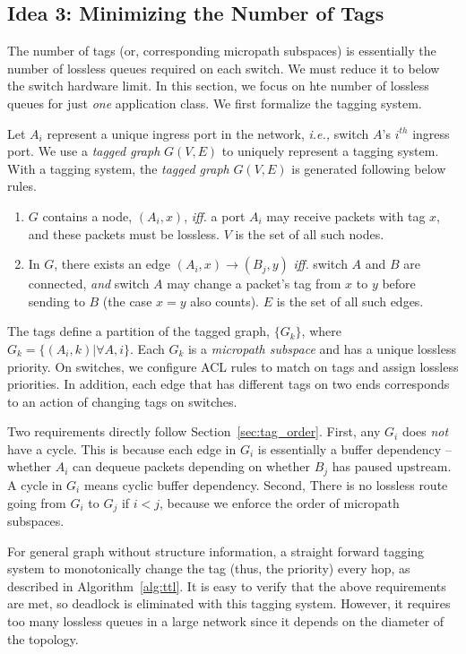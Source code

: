 \subsection{Idea 3: Minimizing the Number of Tags} 
The number of tags (or, corresponding micropath subspaces) is essentially the number of lossless queues required on each switch.
We must reduce it to below the switch hardware limit. In this section, we focus on hte number of lossless queues for 
just {\em one} application class. We first formalize the tagging system.

 Let $A_i$ represent a unique ingress port in the network, {\em i.e.,} switch $A$'s $i^{th}$ ingress port.
We use a {\em tagged graph} $G(V,E)$ to uniquely represent a tagging system.
With a tagging system, the {\em tagged graph} $G(V,E)$ is generated following below rules.

\begin{enumerate}
\item $G$ contains a node, $(A_i, x)$, {\em iff.} a port $A_i$ may receive packets with tag $x$, and these packets must 
be lossless. $V$ is the set of all such nodes.
\item In $G$, there exists an edge $(A_i, x)\rightarrow(B_j, y)$ {\em iff.} switch $A$ and $B$ are 
connected, {\em and} switch $A$ may change a packet's tag from $x$ to $y$ before sending to $B$ (the case $x=y$ also counts).
$E$ is the set of all such edges.
\end{enumerate}


The tags define a partition of the tagged graph, $\{G_k\}$, 
where $G_k = \{(A_i, k) | \forall A, i\}$. Each $G_k$ is a {\em micropath subspace} and has a unique lossless priority.
On switches, we configure ACL rules to match on tags and assign lossless priorities.
In addition, each edge that has different tags on two ends corresponds to an action of changing tags on switches.

Two requirements directly follow Section~\ref{sec:tag_order}. First, any $G_i$ does {\em not} have a cycle. This is because
each edge in $G_i$ is essentially a buffer dependency -- whether $A_i$ can dequeue packets depending on whether $B_j$ 
has paused upstream. A cycle in $G_i$ means cyclic buffer dependency. Second, There is no lossless route going from 
$G_i$ to $G_j$ if $i<j$, because we enforce the order of micropath subspaces.


 For general graph without structure information, a straight forward tagging system
to monotonically change the tag (thus, the priority) every hop, as described in Algorithm~\ref{alg:ttl}. It is easy to 
verify that the above requirements are met, so deadlock is eliminated with this tagging system. However, it requires 
too many lossless queues in a large network since it depends on the diameter of the topology.

